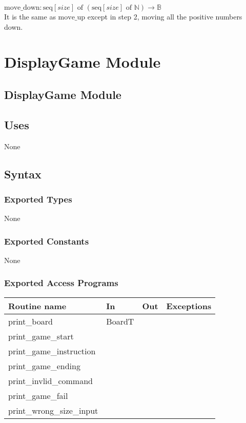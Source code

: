 \documentclass[12pt]{article}
\begin{document}
\noindent $\mbox{move\_down} : \text{seq} [\mathit{size}] \text{ of } (\text{seq} [\mathit{size}] \text{ of } \mathbb{N}) \rightarrow \mathbb{B}$\\ It is the same as $\mbox{move\_up}$ except in step 2, 
moving all the positive numbers down.\\
\newpage





\section* {DisplayGame Module}

\subsection* {DisplayGame Module}

\subsection* {Uses}

None

\subsection* {Syntax}

\subsubsection* {Exported Types}

None

\subsubsection* {Exported Constants}

None

\subsubsection* {Exported Access Programs}

\begin{tabular}{| l | l | l | p{6cm} |}
\hline
\textbf{Routine name} & \textbf{In} & \textbf{Out} & \textbf{Exceptions}\\
\hline
print\_board & BoardT &  &  \\
\hline
print\_game\_start & ~ & ~ & \\
\hline
print\_game\_instruction & ~ & ~ & \\
\hline
print\_game\_ending& ~ & ~ & \\
\hline
print\_invlid\_command & ~ & ~ & \\
\hline
print\_game\_fail & ~ & ~ & \\
\hline
print\_wrong\_size\_input & ~ & ~ & \\
\hline
\end{tabular}
\end{document}
